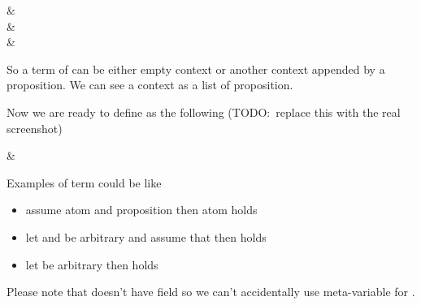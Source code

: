 \documentclass[master.tex]{subfiles}
\begin{document}
 {
    \kVarRegex &  \\

    \kChoice & \bat{\pifmt{$\epsilon$}} \\

    \kChoice &  \\
}

\newcommand{\propEmptyContext}{\bat{\pifmt{$\epsilon$}}}

So a term of  can be either empty context or another context
appended by a proposition. We can see a context as a list of proposition.

Now we are ready to define  as the following (TODO:\ replace
this with the real screenshot)

 {
    \kChoice &  \\
}

\newcommand{\propTurnstile}{\pifmt{$\vdash$}}

Examples of  term could be like
\begin{itemize}
  \item \bat{\bat{\bat{\propEmptyContext\pifmt{,}\bat{\pvar{p}}}\pifmt{,}\bat{\bat{\pvar{p}}\propImp\bat{\pvar{q}}}}\propTurnstile\bat{\pvar{q}}}

  assume atom  and proposition  then atom  holds

  \item \bat{\bat{\propEmptyContext\pifmt{,}\bat{\pvar{B}\propAnd\pvar{A}}}\propTurnstile\bat{\pvar{A}\propAnd\pvar{B}}}

  let  and  be arbitrary  and assume that
       then 
      holds

  \item \bat{\propEmptyContext\propTurnstile\bat{\pvar{A}\propOr\bat{\propNot\pvar{A}}}}

  let  be arbitrary  then
   holds

\end{itemize}

Please note that  doesn't have field \kVarRegex so we can't
accidentally use meta-variable for .
\end{document}
